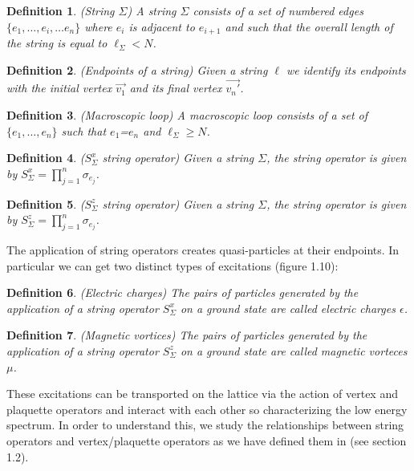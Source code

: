 \documentclass{Configuration_Files/PoliMi3i_thesis}
\newtheorem{definition}{Definition}[chapter]
\begin{document}
\begin{definition}(String $\Sigma$)
	A string $\Sigma$ consists of a set of numbered edges $\{e_1, \dots, e_i, \dots e_n\}$ where $e_i$ is adjacent to $e_{i+1}$ and such that the overall length of the string is equal to $\ell_\Sigma < N$.
\end{definition}

\begin{definition}(Endpoints of a string)
	Given a string $\ell$ we identify its endpoints with the initial vertex $\vec{v_1}$ and its final vertex $\vec{v_n'}$.
\end{definition}

\begin{definition}(Macroscopic loop)
	A macroscopic loop consists of a set of $\{e_1, \dots, e_n\}$ such that $e_1$=$e_n$ and $\ell_\Sigma \ge N$.
\end{definition}

\begin{definition}($S^x_\Sigma$ string operator)
	Given a string $\Sigma$, the string operator is given by $S_\Sigma^x = \prod_{j=1}^{n}\sigma_{e_j}$.
\end{definition}

\begin{definition}($S^z_\Sigma$ string operator)
	Given a string $\Sigma$, the string operator is given by $S_\Sigma^z = \prod_{j=1}^{n}\sigma_{e_j}$.
\end{definition}

The application of string operators creates quasi-particles at their endpoints. In particular we can get two distinct types of excitations (figure 1.10):

\begin{definition}(Electric charges)
	The pairs of particles generated by the application of a string operator $S^x_\Sigma$ on a ground state are called electric charges $\epsilon$.
\end{definition}

\begin{definition}(Magnetic vortices)
	The pairs of particles generated by the application of a string operator $S^z_\Sigma$ on a ground state are called magnetic vorteces $\mu$.
\end{definition}

These excitations can be transported on the lattice via the action of vertex and plaquette operators and interact with each other so characterizing the low energy spectrum.\newline
In order to understand this, we study the relationships between string operators and vertex/plaquette operators as we have defined them in  (see section 1.2).\newline
\end{document}

